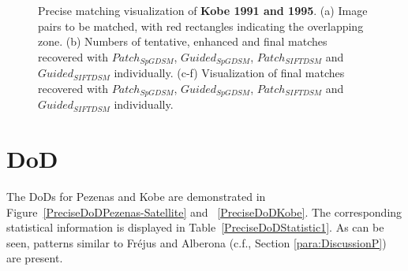 \begin{figure}[htbp]
\begin{center}
{\begin{minipage}[t]{0.48\linewidth}
			\end{minipage}%
		}
		\caption{Precise matching visualization of \textbf{Kobe 1991 and 1995}. (a) Image pairs to be matched, with red rectangles indicating the overlapping zone. (b) Numbers of tentative, enhanced and final matches recovered with $Patch_{SpGDSM}$, $Guided_{SpGDSM}$, $Patch_{SIFTDSM}$ and $Guided_{SIFTDSM}$ individually. (c-f) Visualization of final matches recovered with $Patch_{SpGDSM}$, $Guided_{SpGDSM}$, $Patch_{SIFTDSM}$ and $Guided_{SIFTDSM}$ individually.}
		\label{MatchVizKobe}
	\end{center}
\end{figure} 

\section{DoD}
\label{sec:PreciseDoD}
The \ac{DoD}s for Pezenas and Kobe are demonstrated in Figure~\ref{PreciseDoDPezenas-Satellite} and ~\ref{PreciseDoDKobe}. 
The corresponding statistical information is displayed in Table~\ref{PreciseDoDStatistic1}.
As can be seen, patterns similar to Fr{\'e}jus and Alberona (c.f., Section \ref{para:DiscussionP}) are present.%


